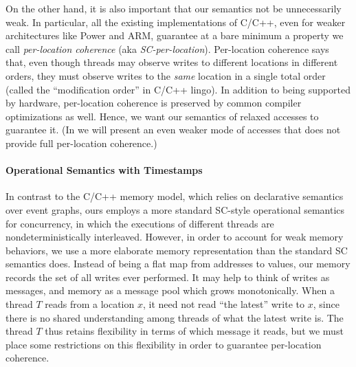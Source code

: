 On the other hand,
it is also important that our semantics not be
unnecessarily weak.  In particular, all the existing 
implementations of C/C++, even for weaker architectures like Power and
ARM, guarantee at a bare minimum a property we call \emph{per-location
  coherence} (aka \emph{SC-per-location}).  Per-location coherence
says that, even though threads may observe writes to different
locations in different orders, they must observe writes to the
\emph{same} location in a single total order (called the
``modification order'' in C/C++ lingo).
 In addition to being supported by hardware,
per-location coherence is preserved by common compiler optimizations
as well.  Hence, we want our semantics of relaxed accesses to
guarantee it. (In  we will present an even weaker mode of accesses that
does not provide full per-location coherence.)



\paragraph{Operational Semantics with Timestamps}

In contrast to the C/C++ memory model, which relies on declarative
semantics over event graphs, ours employs a more standard SC-style
operational semantics for concurrency, in which the executions of
different threads are nondeterministically interleaved.  However, in
order to account for weak memory behaviors, we use a more elaborate
memory representation than the standard SC semantics does.  Instead of
being a flat map from addresses to values, our memory records the set
of all writes ever performed.  It may help to think of writes as
messages, and memory as a message pool which grows monotonically.  When
a thread $T$ reads from a location $x$, it need not read ``the
latest'' write to $x$, since there is no shared understanding among
threads of what the latest write is.  The thread $T$ thus retains
flexibility in terms of which message it reads, but we must place some
restrictions on this flexibility in order to guarantee per-location
coherence.

